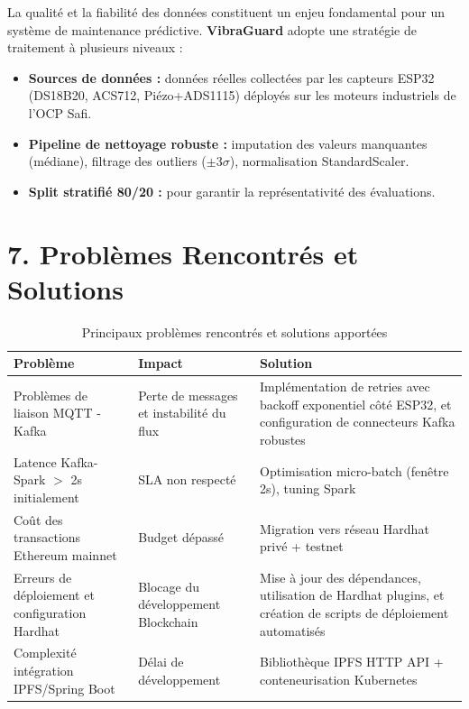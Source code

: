 \documentclass[12pt, a4paper, oneside]{report}
\newcommand{\projectname}{\textbf{VibraGuard}}
\begin{document}
La qualité et la fiabilité des données constituent un enjeu fondamental pour un système de
maintenance prédictive. \projectname{} adopte une stratégie de traitement à plusieurs niveaux :

\begin{itemize}
  \item \textbf{Sources de données :} données réelles collectées par les capteurs ESP32
  (DS18B20, ACS712, Piézo+ADS1115) déployés sur les moteurs industriels de l'OCP Safi.
  \item \textbf{Pipeline de nettoyage robuste :} imputation des valeurs manquantes (médiane),
  filtrage des outliers ($\pm 3\sigma$), normalisation StandardScaler.
  \item \textbf{Split stratifié 80/20 :} pour garantir la représentativité des évaluations.
\end{itemize}

\section*{7. Problèmes Rencontrés et Solutions}

\begin{table}[H]
  \centering
  \begin{tabularx}{\textwidth}{L{4cm} L{4cm} L{4cm}}
    \toprule
    \textbf{Problème} &
    \textbf{Impact} &
    \textbf{Solution} \\
    \midrule
    Problèmes de liaison MQTT - Kafka & Perte de messages et instabilité du flux & Implémentation de retries avec backoff exponentiel côté ESP32, et configuration de connecteurs Kafka robustes \\
    Latence Kafka-Spark $>$ 2s initialement & SLA non respecté & Optimisation micro-batch (fenêtre 2s), tuning Spark \\
    Coût des transactions Ethereum mainnet & Budget dépassé & Migration vers réseau Hardhat privé + testnet \\
    Erreurs de déploiement et configuration Hardhat & Blocage du développement Blockchain & Mise à jour des dépendances, utilisation de Hardhat plugins, et création de scripts de déploiement automatisés \\
    Complexité intégration IPFS/Spring Boot & Délai de développement & Bibliothèque IPFS HTTP API + conteneurisation Kubernetes \\
    \bottomrule
  \end{tabularx}
  \caption{Principaux problèmes rencontrés et solutions apportées}
\end{table}
\end{document}
